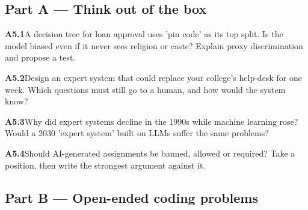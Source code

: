 \documentclass[11pt]{article}
\begin{document}
\subsection*{\color{navy}Part A --- Think out of the box}
\begin{tcolorbox}[enhanced,colback=goldL,colframe=gold!80!black,arc=2mm,boxrule=0.8pt,left=3mm]
\textbf{\color{navy}A5.1}\quad A decision tree for loan approval uses 'pin code' as its top split. Is the model biased even if it never sees religion or caste? Explain proxy discrimination and propose a test.\hfill{}
\end{tcolorbox}
\begin{tcolorbox}[enhanced,colback=goldL,colframe=gold!80!black,arc=2mm,boxrule=0.8pt,left=3mm]
\textbf{\color{navy}A5.2}\quad Design an expert system that could replace your college's help-desk for one week. Which questions must still go to a human, and how would the system know?\hfill{}
\end{tcolorbox}
\begin{tcolorbox}[enhanced,colback=goldL,colframe=gold!80!black,arc=2mm,boxrule=0.8pt,left=3mm]
\textbf{\color{navy}A5.3}\quad Why did expert systems decline in the 1990s while machine learning rose? Would a 2030 'expert system' built on LLMs suffer the same problems?\hfill{}
\end{tcolorbox}
\begin{tcolorbox}[enhanced,colback=goldL,colframe=gold!80!black,arc=2mm,boxrule=0.8pt,left=3mm]
\textbf{\color{navy}A5.4}\quad Should AI-generated assignments be banned, allowed or required? Take a position, then write the strongest argument against it.\hfill{}
\end{tcolorbox}
\subsection*{\color{navy}Part B --- Open-ended coding problems}
\end{document}
